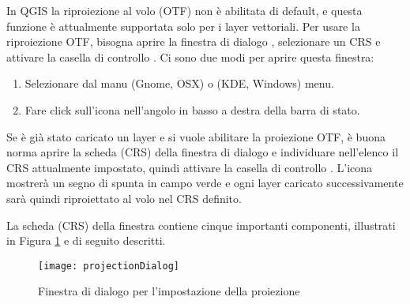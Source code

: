 In QGIS la riproiezione al volo (OTF) non è abilitata di default, e questa funzione è attualmente
supportata solo per i layer vettoriali. Per usare la riproiezione OTF, bisogna aprire la finestra
di dialogo , selezionare un CRS e attivare la casella di controllo
.
Ci sono due modi per aprire questa finestra:

\begin{enumerate}
\item Selezionare  dal manu
 (Gnome, OSX) o  (KDE, Windows) menu.
\item Fare click sull'icona  nell'angolo 
in basso a destra della barra di stato.
\end{enumerate}

Se è già stato caricato un layer e si vuole abilitare la proiezione OTF, è buona norma aprire
la scheda  (CRS) della finestra di dialogo 
 e individuare nell'elenco il CRS attualmente impostato, 
quindi attivare la casella di controllo .
L'icona  mostrerà un segno di spunta in campo 
verde e ogni layer caricato successivamente sarà quindi riproiettato al volo nel CRS definito.

La scheda  (CRS) della finestra 
contiene cinque importanti componenti, illustrati in Figura \ref{fig:projections} e di seguito descritti.

\begin{figure}[ht]
   \centering
   \texttt{[image: projectionDialog]}
   \caption{Finestra di dialogo per l'impostazione della proiezione \nixcaption}\label{fig:projections}
\end{figure}

